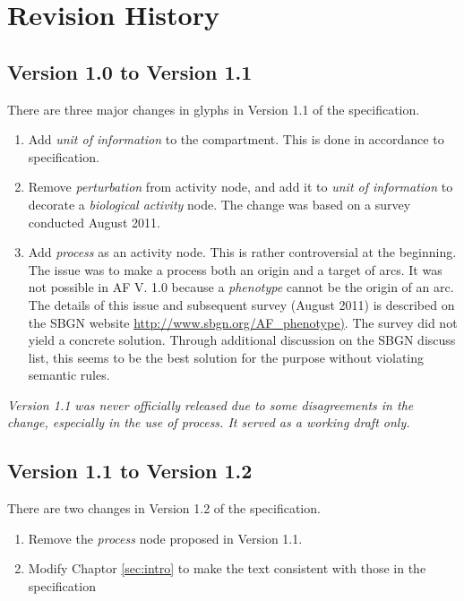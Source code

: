 \chapter{Revision History}

\section{Version 1.0 to Version 1.1}

There are three major changes in glyphs in Version 1.1 of the \SBGNAFLone specification. 
\begin{enumerate}
\item{Add \emph{unit of information} to the compartment.  This is done in accordance to \SBGNPDLone specification.}
\item{Remove \emph{perturbation} from activity node, and add it to \emph{unit of information} to decorate a \emph{biological activity} node.  The change was based on a survey conducted August 2011.
}
\item{Add \emph{process} as an activity node. This is rather controversial at the beginning.  The issue was to make a process both an origin and a target of arcs.  It was not possible in AF V. 1.0 because a \emph{phenotype} cannot be the origin of an arc.  The details of this issue and subsequent survey (August 2011) is described on the SBGN website \url{http://www.sbgn.org/AF_phenotype)}. The survey did not yield a concrete solution.  Through additional discussion on the SBGN discuss list, this seems to be the best solution for the purpose without violating semantic rules.
}
\end{enumerate}

\textit{Version 1.1 was never officially released due to some disagreements in the change, especially in the use of process. It served as a working draft only.}

\section{Version 1.1 to Version 1.2}

There are two changes in Version 1.2 of the \SBGNAFLone specification. 
\begin{enumerate}
\item{Remove the \emph{process} node proposed in Version 1.1.}
\item{Modify Chaptor \ref{sec:intro} to make the text consistent with those in the \SBGNPDLone specification}
\end{enumerate}


